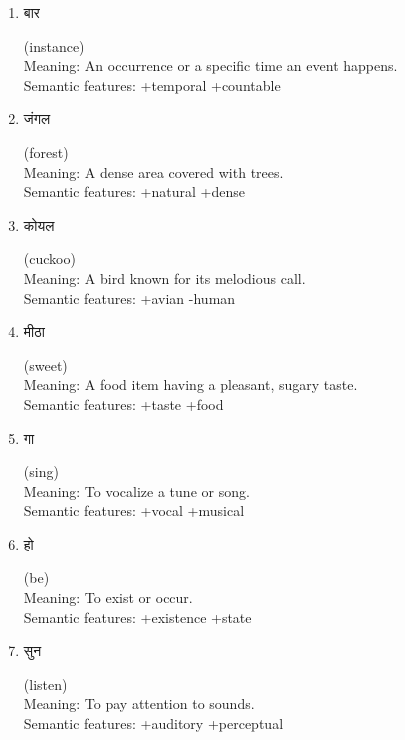 \documentclass{article}
\begin{document}
\begin{enumerate}
\item \begin{hindi} बार \end{hindi} (instance) \\
Meaning: An occurrence or a specific time an event happens. \\
Semantic features: +temporal +countable

\item \begin{hindi} जंगल \end{hindi} (forest) \\
Meaning: A dense area covered with trees. \\
Semantic features: +natural +dense

\item \begin{hindi} कोयल \end{hindi} (cuckoo) \\
Meaning: A bird known for its melodious call. \\
Semantic features: +avian -human

\item \begin{hindi} मीठा \end{hindi} (sweet) \\
Meaning: A food item having a pleasant, sugary taste. \\
Semantic features: +taste +food

\item \begin{hindi} गा \end{hindi} (sing) \\
Meaning: To vocalize a tune or song. \\
Semantic features: +vocal +musical

\item \begin{hindi} हो \end{hindi} (be) \\
Meaning: To exist or occur. \\
Semantic features: +existence +state

\item \begin{hindi} सुन \end{hindi} (listen) \\
Meaning: To pay attention to sounds. \\
Semantic features: +auditory +perceptual


\end{enumerate}
\end{document}
